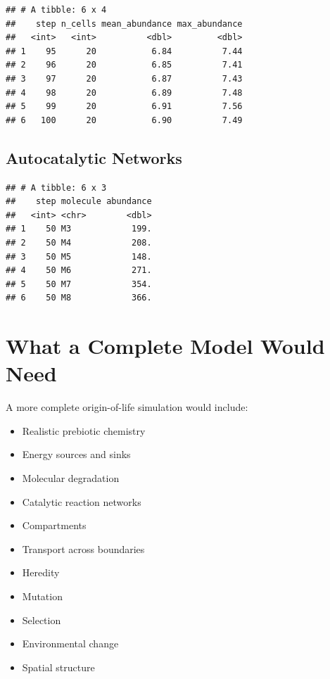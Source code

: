 \documentclass[
  oneside,
  openany]{book}
\newenvironment{Shaded}{\begin{snugshade}}{\end{snugshade}}
\newcommand{\AttributeTok}[1]{\textcolor[rgb]{0.13,0.29,0.53}{#1}}
\newcommand{\DecValTok}[1]{\textcolor[rgb]{0.00,0.00,0.81}{#1}}
\newcommand{\FloatTok}[1]{\textcolor[rgb]{0.00,0.00,0.81}{#1}}
\newcommand{\FunctionTok}[1]{\textcolor[rgb]{0.13,0.29,0.53}{\textbf{#1}}}
\newcommand{\NormalTok}[1]{#1}
\newcommand{\OtherTok}[1]{\textcolor[rgb]{0.56,0.35,0.01}{#1}}
\newcommand{\SpecialCharTok}[1]{\textcolor[rgb]{0.81,0.36,0.00}{\textbf{#1}}}
\providecommand{\tightlist}{%
  \setlength{\itemsep}{0pt}\setlength{\parskip}{0pt}}
\begin{document}
\begin{verbatim}
## # A tibble: 6 x 4
##    step n_cells mean_abundance max_abundance
##   <int>   <int>          <dbl>         <dbl>
## 1    95      20           6.84          7.44
## 2    96      20           6.85          7.41
## 3    97      20           6.87          7.43
## 4    98      20           6.89          7.48
## 5    99      20           6.91          7.56
## 6   100      20           6.90          7.49
\end{verbatim}

\subsection{Autocatalytic Networks}\label{autocatalytic-networks-1}

\begin{Shaded}
\end{Shaded}

\begin{verbatim}
## # A tibble: 6 x 3
##    step molecule abundance
##   <int> <chr>        <dbl>
## 1    50 M3            199.
## 2    50 M4            208.
## 3    50 M5            148.
## 4    50 M6            271.
## 5    50 M7            354.
## 6    50 M8            366.
\end{verbatim}

\section{What a Complete Model Would Need}\label{what-a-complete-model-would-need}

A more complete origin-of-life simulation would include:

\begin{itemize}
\tightlist
\item
  Realistic prebiotic chemistry
\item
  Energy sources and sinks
\item
  Molecular degradation
\item
  Catalytic reaction networks
\item
  Compartments
\item
  Transport across boundaries
\item
  Heredity
\item
  Mutation
\item
  Selection
\item
  Environmental change
\item
  Spatial structure
\end{itemize}
\end{document}
